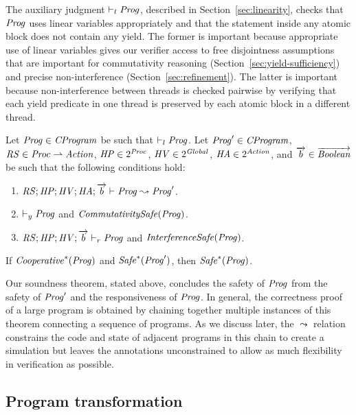 The auxiliary judgment $\vdash_l \mathit{Prog}$, described in Section~\ref{sec:linearity}, 
checks that $\mathit{Prog}$ uses linear variables appropriately and that the statement
inside any atomic block does not contain any yield.
The former is important because appropriate use of linear variables gives our verifier access to free disjointness
assumptions that are important for commutativity reasoning (Section~\ref{sec:yield-sufficiency})
and precise non-interference (Section~\ref{sec:refinement}).
The latter is important because non-interference between threads is checked pairwise by verifying that each yield predicate
in one thread is preserved by each atomic block in a different thread.

\begin{theorem}
\label{thm:correctness}
Let $\mathit{Prog} \in \mathit{CProgram}$ be such that $\vdash_l \mathit{Prog}$.
Let $\mathit{Prog}' \in \mathit{CProgram}$, $\mathit{RS} \in \mathit{Proc} \rightharpoonup \mathit{Action}$, $\mathit{HP} \in 2^{\mathit{Proc}}$, 
$\mathit{HV} \in 2^{\mathit{Global}}$, $\mathit{HA} \in 2^{\mathit{Action}}$,
and $\overrightarrow{b} \in \overrightarrow{\mathit{Boolean}}$ be such that the following conditions hold:
\begin{enumerate}
\item
$\mathit{RS};\mathit{HP};\mathit{HV};\mathit{HA};\overrightarrow{b} \vdash \mathit{Prog} \leadsto \mathit{Prog}'$.
\item
$\vdash_y \mathit{Prog}$ and $\mathit{CommutativitySafe}(\mathit{Prog})$.
\item
$\mathit{RS};\mathit{HP};\mathit{HV};\overrightarrow{b} \vdash_r \mathit{Prog}$ and $\mathit{InterferenceSafe}(\mathit{Prog})$.
\end{enumerate}
If $\mathit{Cooperative}^*(\mathit{Prog})$ and $\mathit{Safe}^*(\mathit{Prog}')$, then $\mathit{Safe}^*(\mathit{Prog})$.
\end{theorem}

Our soundness theorem, stated above, concludes the safety of $\mathit{Prog}$ from the safety of $\mathit{Prog}'$ 
and the responsiveness of $\mathit{Prog}$.
In general, the correctness proof of a large program is obtained by chaining together
multiple instances of this theorem connecting a sequence of programs.  
As we discuss later, the $\leadsto$ relation constrains the code and state of adjacent programs in this chain 
to create a simulation but leaves the annotations unconstrained to allow as much flexibility in verification as possible.

\subsection{Program transformation}
\label{sec:program-transformation}

